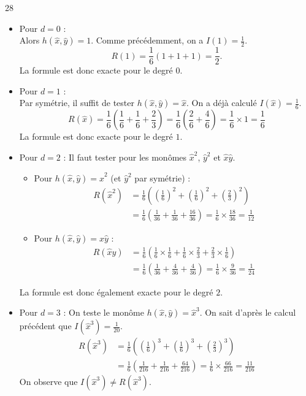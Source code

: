 \begin{reponse}{28}
    \begin{itemize}
        \item Pour $d=0$ : \\
        Alors $h(\hat{x}, \hat{y}) = 1$. Comme précédemment, on a $I(1)=\frac{1}{2}$. 
        \[
            R(1) = \frac{1}{6} \left(1 + 1 + 1 \right) = \frac{1}{2}.
        \]
        La formule est donc exacte pour le degré $0$. \\
        \item Pour $d=1$ : \\
        Par symétrie, il suffit de tester $h(\hat{x},\hat{y}) = \hat{x}$. On a déjà calculé $I(\hat{x}) = \frac{1}{6}$.
        \[
            R(\hat{x}) = \frac{1}{6} \left( \frac{1}{6} + \frac{1}{6} + \frac{2}{3} \right) = \frac{1}{6} \left( \frac{2}{6} + \frac{4}{6} \right) = \frac{1}{6} \times 1 = \frac{1}{6}
        \]
        La formule est donc exacte pour le degré $1$. \\
        \item Pour $d=2$ :
        Il faut tester pour les monômes $\hat{x}^2$, $\hat{y}^2$ et $\hat{x}\hat{y}$. \\
        \begin{itemize}
            \item Pour $h(\hat{x}, \hat{y}) = \hat{x}^2$ (et $\hat{y}^2$ par symétrie) :
            \begin{align*}  
                R(\hat{x}^2) & = \frac{1}{6}\left(\left(\frac{1}{6}\right)^2 + \left(\frac{1}{6}\right)^2 + \left( \frac{2}{3}\right)^2 \right) \\ & = \frac{1}{6} \left( \frac{1}{36} + \frac{1}{36} + \frac{16}{36} \right) = \frac{1}{6} \times \frac{18}{36} = \frac{1}{12}
            \end{align*}
            \item Pour $h(\hat{x}, \hat{y}) = \hat{x}\hat{y}$ :
            \begin{align*}               
                R(\hat{x}\hat{y}) & = \frac{1}{6}\left(\frac{1}{6} \times \frac{1}{6} + \frac{1}{6} \times \frac{2}{3} + \frac{2}{3} \times \frac{1}{6}\right) \\ & = \frac{1}{6} \left( \frac{1}{36} + \frac{4}{36} + \frac{4}{36} \right) = \frac{1}{6} \times \frac{9}{36} = \frac{1}{24}
            \end{align*}
        \end{itemize}
    La formule est donc également exacte pour le degré $2$. \\
    \item Pour $d=3$ :
    On teste le monôme $h(\hat{x}, \hat{y}) = \hat{x}^3$. On sait d'après le calcul précédent que $I(\hat{x}^3) = \frac{1}{20}$.
    \begin{align*} 
        R(\hat{x}^3) & = \frac{1}{6} \left( \left(\frac{1}{6}\right)^3 + \left(\frac{1}{6}\right)^3 + \left(\frac{2}{3}\right)^3 \right) \\ & = \frac{1}{6} \left( \frac{1}{216} + \frac{1}{216} + \frac{64}{216} \right) = \frac{1}{6} \times \frac{66}{216} = \frac{11}{216}
    \end{align*}
    On observe que $I(\hat{x}^3) \neq R(\hat{x}^3)$.
    \end{itemize}
    

\end{reponse}
